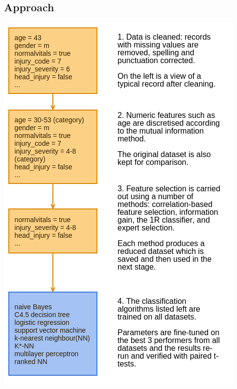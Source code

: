 \documentclass[portrait]{usydposter}
\begin{document}
\begin{multicols}{3}
\section{Approach}
\includegraphics{approach}


\end{multicols}
\end{document}
